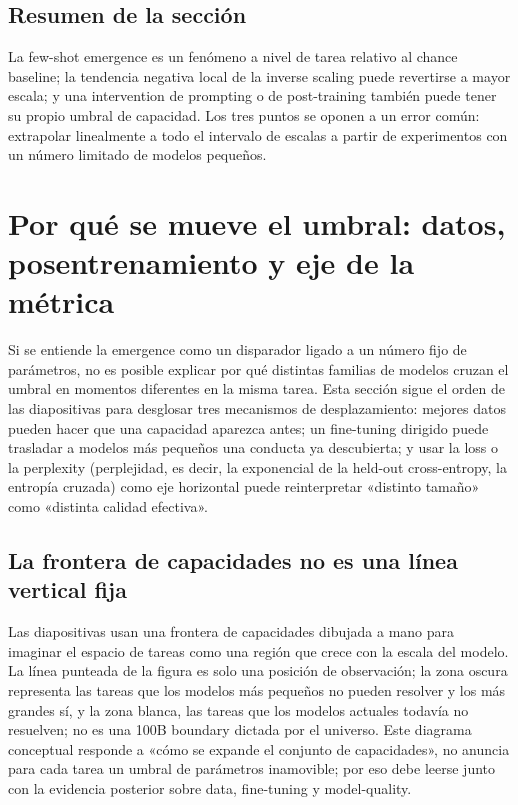 \documentclass[a4paper]{article}
\begin{document}
\subsection{Resumen de la sección}

La few-shot emergence es un fenómeno a nivel de tarea relativo al chance baseline; la tendencia negativa local de la inverse scaling puede revertirse a mayor escala; y una intervention de prompting o de post-training también puede tener su propio umbral de capacidad. Los tres puntos se oponen a un error común: extrapolar linealmente a todo el intervalo de escalas a partir de experimentos con un número limitado de modelos pequeños.
\section{Por qué se mueve el umbral: datos, posentrenamiento y eje de la métrica}

Si se entiende la emergence como un disparador ligado a un número fijo de parámetros, no es posible explicar por qué distintas familias de modelos cruzan el umbral en momentos diferentes en la misma tarea. Esta sección sigue el orden de las diapositivas para desglosar tres mecanismos de desplazamiento: mejores datos pueden hacer que una capacidad aparezca antes; un fine-tuning dirigido puede trasladar a modelos más pequeños una conducta ya descubierta; y usar la loss o la perplexity (perplejidad, es decir, la exponencial de la held-out cross-entropy, la entropía cruzada) como eje horizontal puede reinterpretar «distinto tamaño» como «distinta calidad efectiva».

\subsection{La frontera de capacidades no es una línea vertical fija}

Las diapositivas usan una frontera de capacidades dibujada a mano para imaginar el espacio de tareas como una región que crece con la escala del modelo. La línea punteada de la figura es solo una posición de observación; la zona oscura representa las tareas que los modelos más pequeños no pueden resolver y los más grandes sí, y la zona blanca, las tareas que los modelos actuales todavía no resuelven; no es una 100B boundary dictada por el universo. Este diagrama conceptual responde a «cómo se expande el conjunto de capacidades», no anuncia para cada tarea un umbral de parámetros inamovible; por eso debe leerse junto con la evidencia posterior sobre data, fine-tuning y model-quality.
\end{document}
